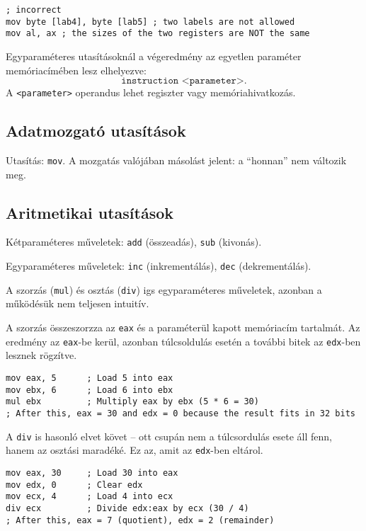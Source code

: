 \begin{lstlisting}[style=asmstyle, caption={Helytelen paraméterezés}]
; incorrect
mov byte [lab4], byte [lab5] ; two labels are not allowed
mov al, ax ; the sizes of the two registers are NOT the same
\end{lstlisting}

Egyparaméteres utasításoknál a végeredmény az egyetlen paraméter memóriacímében lesz elhelyezve:
\[ \texttt{instruction <parameter>}. \]
A \texttt{<parameter>} operandus lehet regiszter vagy memóriahivatkozás.

\subsection{Adatmozgató utasítások}

Utasítás: \texttt{mov}. A mozgatás valójában másolást jelent: a ``honnan'' nem változik meg.

\subsection{Aritmetikai utasítások}

Kétparaméteres műveletek: \texttt{add} (összeadás), \texttt{sub} (kivonás).

Egyparaméteres műveletek: \texttt{inc} (inkrementálás), \texttt{dec} (dekrementálás).

A szorzás (\texttt{mul}) és osztás (\texttt{div}) igs egyparaméteres műveletek, azonban a működésük nem teljesen intuitív.

A szorzás összeszorzza az \texttt{eax} és a paraméterül kapott memóriacím tartalmát. Az eredmény az \texttt{eax}-be kerül, azonban túlcsoldulás esetén a további bitek az \texttt{edx}-ben lesznek rögzítve.

\begin{lstlisting}[style=asmstyle]
mov eax, 5      ; Load 5 into eax
mov ebx, 6      ; Load 6 into ebx
mul ebx         ; Multiply eax by ebx (5 * 6 = 30)
; After this, eax = 30 and edx = 0 because the result fits in 32 bits
\end{lstlisting}

A \texttt{div} is hasonló elvet követ -- ott csupán nem a túlcsordulás esete áll fenn, hanem az osztási maradéké. Ez az, amit az \texttt{edx}-ben eltárol.

\begin{lstlisting}[style=asmstyle]
mov eax, 30     ; Load 30 into eax
mov edx, 0      ; Clear edx
mov ecx, 4      ; Load 4 into ecx
div ecx         ; Divide edx:eax by ecx (30 / 4)
; After this, eax = 7 (quotient), edx = 2 (remainder)
\end{lstlisting}

